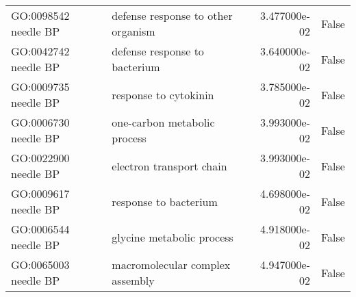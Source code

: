 \begin{tabular}{llrl}
GO:0098542 needle BP       &  defense response to other organism &  3.477000e-02 &  False \\
GO:0042742 needle BP       &  defense response to bacterium &  3.640000e-02 &  False \\
GO:0009735 needle BP       &  response to cytokinin &  3.785000e-02 &  False \\
GO:0006730 needle BP       &  one-carbon metabolic process &  3.993000e-02 &  False \\
GO:0022900 needle BP       &  electron transport chain &  3.993000e-02 &  False \\
GO:0009617 needle BP       &  response to bacterium &  4.698000e-02 &  False \\
GO:0006544 needle BP       &  glycine metabolic process &  4.918000e-02 &  False \\
GO:0065003 needle BP       &  macromolecular complex assembly &  4.947000e-02 &  False \\
\bottomrule
\end{tabular}
